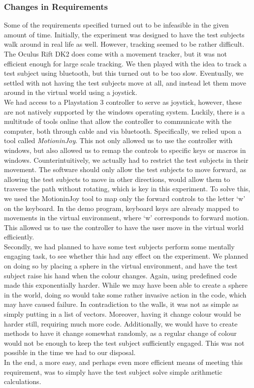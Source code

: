 \subsubsection{Changes in Requirements}
Some of the requirements specified turned out to be infeasible in the given amount of time.
Initially, the experiment was designed to have the test subjects walk around in real life as well.
However, tracking seemed to be rather difficult.
The Oculus Rift DK2 does come with a movement tracker, but it was not efficient enough for large scale tracking.
We then played with the idea to track a test subject using bluetooth, but this turned out to be too slow.
Eventually, we settled with not having the test subjects move at all, and instead let them move around in the virtual world using a joystick. \\
We had access to a Playstation 3 controller to serve as joystick, however, these are not natively supported by the windows operating system.
Luckily, there is a multitude of tools online that allow the controller to communicate with the computer, both through cable and via bluetooth.
Specifically, we relied upon a tool called \textit{MotioninJoy}.
This not only allowed us to use the controller with windows, but also allowed us to remap the controls to specific keys or macros in windows.
Counterintuitively, we actually had to restrict the test subjects in their movement.
The software should only allow the test subjects to move forward, as allowing the test subjects to move in other directions, would allow them to traverse the path without rotating, which is key in this experiment.
To solve this, we used the MotioninJoy tool to map only the forward controls to the letter `w' on the keyboard.
In the demo program, keyboard keys are already mapped to movements in the virtual environment, where `w' corresponds to forward motion.
This allowed us to use the controller to have the user move in the virtual world efficiently. \\

Secondly, we had planned to have some test subjects perform some mentally engaging task, to see whether this had any effect on the experiment.
We planned on doing so by placing a sphere in the virtual environment, and have the test subject raise his hand when the colour changes.
Again, using predefined code made this exponentially harder.
While we may have been able to create a sphere in the world, doing so would take some rather invasive action in the code, which may have caused failure.
In contradiction to the walls, it was not as simple as simply putting in a list of vectors.
Moreover, having it change colour would be harder still, requiring much more code.
Additionally, we would have to create methods to have it change somewhat randomly, as a regular change of colour would not be enough to keep the test subject sufficiently engaged.
This was not possible in the time we had to our disposal. \\
In the end, a more easy, and perhaps even more efficient means of meeting this requirement, was to simply have the test subject solve simple arithmetic calculations. 
